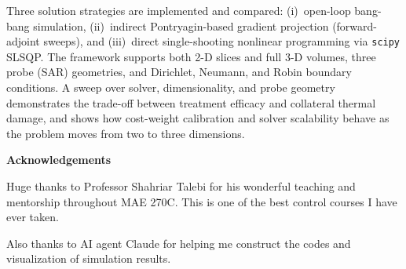 Three solution strategies are implemented and compared:
(i)~open-loop bang-bang simulation,
(ii)~indirect Pontryagin-based gradient projection (forward-adjoint sweeps), and
(iii)~direct single-shooting nonlinear programming via \texttt{scipy} SLSQP.
The framework supports both 2-D slices and full 3-D volumes, three probe
(SAR) geometries, and Dirichlet, Neumann, and Robin boundary conditions.
A sweep over solver, dimensionality, and probe geometry demonstrates the
trade-off between treatment efficacy and collateral thermal damage, and shows
how cost-weight calibration and solver scalability behave as the problem moves
from two to three dimensions.

\cleardoublepage
{}

\begin{center}\textbf{Acknowledgements}\end{center}

\noindent
Huge thanks to Professor Shahriar Talebi for his wonderful teaching and mentorship throughout MAE 270C.
This is one of the best control courses I have ever taken.

Also thanks to AI agent Claude for helping me construct the codes and visualization of simulation results.

\cleardoublepage
{}

\renewcommand\contentsname{Table of Contents}
\tableofcontents
\cleardoublepage
{}

\printglossary[type=symbols]
\cleardoublepage
{}

